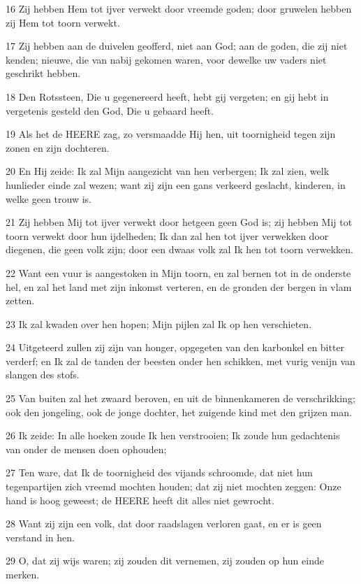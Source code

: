 \par 16 Zij hebben Hem tot ijver verwekt door vreemde goden; door gruwelen hebben zij Hem tot toorn verwekt.
\par 17 Zij hebben aan de duivelen geofferd, niet aan God; aan de goden, die zij niet kenden; nieuwe, die van nabij gekomen waren, voor dewelke uw vaders niet geschrikt hebben.
\par 18 Den Rotssteen, Die u gegenereerd heeft, hebt gij vergeten; en gij hebt in vergetenis gesteld den God, Die u gebaard heeft.
\par 19 Als het de HEERE zag, zo versmaadde Hij hen, uit toornigheid tegen zijn zonen en zijn dochteren.
\par 20 En Hij zeide: Ik zal Mijn aangezicht van hen verbergen; Ik zal zien, welk hunlieder einde zal wezen; want zij zijn een gans verkeerd geslacht, kinderen, in welke geen trouw is.
\par 21 Zij hebben Mij tot ijver verwekt door hetgeen geen God is; zij hebben Mij tot toorn verwekt door hun ijdelheden; Ik dan zal hen tot ijver verwekken door diegenen, die geen volk zijn; door een dwaas volk zal Ik hen tot toorn verwekken.
\par 22 Want een vuur is aangestoken in Mijn toorn, en zal bernen tot in de onderste hel, en zal het land met zijn inkomst verteren, en de gronden der bergen in vlam zetten.
\par 23 Ik zal kwaden over hen hopen; Mijn pijlen zal Ik op hen verschieten.
\par 24 Uitgeteerd zullen zij zijn van honger, opgegeten van den karbonkel en bitter verderf; en Ik zal de tanden der beesten onder hen schikken, met vurig venijn van slangen des stofs.
\par 25 Van buiten zal het zwaard beroven, en uit de binnenkameren de verschrikking; ook den jongeling, ook de jonge dochter, het zuigende kind met den grijzen man.
\par 26 Ik zeide: In alle hoeken zoude Ik hen verstrooien; Ik zoude hun gedachtenis van onder de mensen doen ophouden;
\par 27 Ten ware, dat Ik de toornigheid des vijands schroomde, dat niet hun tegenpartijen zich vreemd mochten houden; dat zij niet mochten zeggen: Onze hand is hoog geweest; de HEERE heeft dit alles niet gewrocht.
\par 28 Want zij zijn een volk, dat door raadslagen verloren gaat, en er is geen verstand in hen.
\par 29 O, dat zij wijs waren; zij zouden dit vernemen, zij zouden op hun einde merken.

